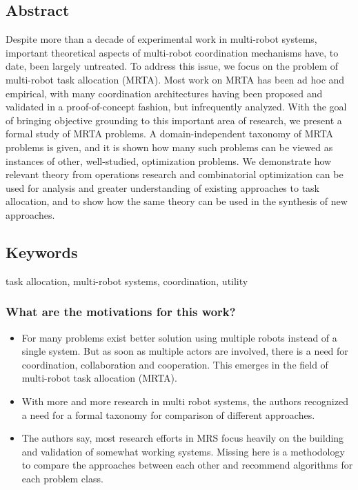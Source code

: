     \subsection*{Abstract}
    Despite more than a decade of experimental work in multi-robot
    systems, important theoretical aspects of multi-robot coordination
    mechanisms have, to date, been largely untreated. To address this
    issue, we focus on the problem of multi-robot task allocation (MRTA).
    Most work on MRTA has been ad hoc and empirical, with many
    coordination architectures having been proposed and validated in a
    proof-of-concept fashion, but infrequently analyzed. With the goal of
    bringing objective grounding to this important area of research, we
    present a formal study of MRTA problems. A domain-independent
    taxonomy of MRTA problems is given, and it is shown how many
    such problems can be viewed as instances of other, well-studied,
    optimization problems. We demonstrate how relevant theory from
    operations research and combinatorial optimization can be used for
    analysis and greater understanding of existing approaches to task
    allocation, and to show how the same theory can be used in the
    synthesis of new approaches.
    
    \subsection*{Keywords}
    task allocation, multi-robot systems, coordination, utility
    
     
    \subsubsection*{What are the motivations for this work?}
    \begin{itemize}
        \item For many problems exist better solution using multiple robots instead of a single system. But as soon as multiple actors are involved, there is a need for coordination, collaboration and cooperation. This emerges in the field of multi-robot task allocation (MRTA).
        \item With more and more research in multi robot systems, the authors recognized a need for a formal taxonomy for comparison of different approaches. 
        \item The authors say, most research efforts in MRS focus heavily on the building and validation of somewhat working systems. Missing here is a methodology to compare the approaches between each other and recommend algorithms for each problem class.
    \end{itemize}
